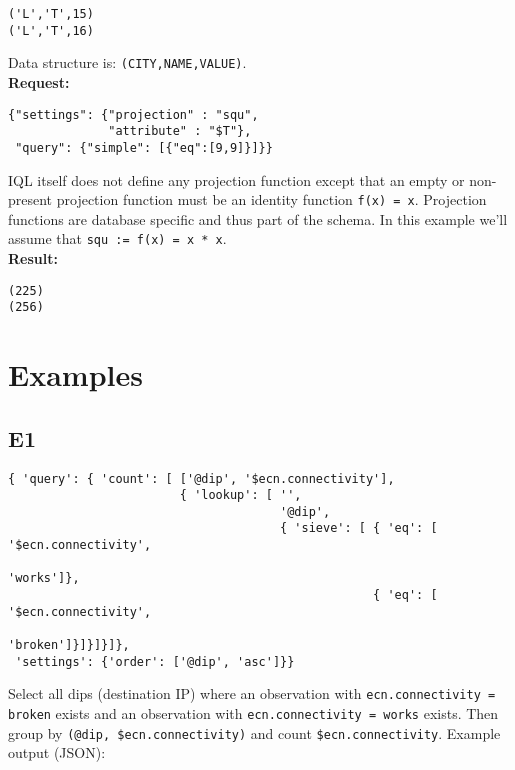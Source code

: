 \documentclass[a4paper]{article}
\begin{document}
\begin{verbatim}
('L','T',15)
('L','T',16)
\end{verbatim}

Data structure is: \verb|(CITY,NAME,VALUE)|. \\

\textbf{Request:}

\begin{verbatim}
{"settings": {"projection" : "squ",
              "attribute" : "$T"},
 "query": {"simple": [{"eq":[9,9]}]}}
\end{verbatim}

IQL itself does not define any projection function except that an
empty or non-present projection function must be an identity function
\verb|f(x) = x|.
Projection functions are database specific and thus part of the schema. In this example we'll assume that \verb|squ := f(x) = x * x|. \\

\textbf{Result:}

\begin{verbatim}
(225)
(256)
\end{verbatim}

\section{Examples}

\subsection{E1}

\tiny
\begin{verbatim}
{ 'query': { 'count': [ ['@dip', '$ecn.connectivity'],
                        { 'lookup': [ '',
                                      '@dip',
                                      { 'sieve': [ { 'eq': [ '$ecn.connectivity',
                                                             'works']},
                                                   { 'eq': [ '$ecn.connectivity',
                                                             'broken']}]}]}]},
 'settings': {'order': ['@dip', 'asc']}}
\end{verbatim}
\normalsize

Select all dips (destination IP) where an observation with
\verb|ecn.connectivity = broken| exists and an observation with
\verb|ecn.connectivity = works| exists.  Then group by
\verb|(@dip, $ecn.connectivity)| and count
\verb|$ecn.connectivity|. Example output (JSON):
\end{document}
